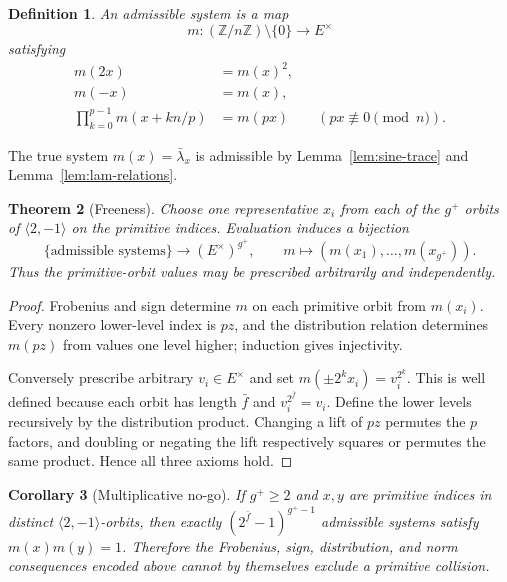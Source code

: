 \documentclass[a4paper]{article}
\newtheorem{theorem}{Theorem}[section]
\newtheorem{corollary}[theorem]{Corollary}
\newtheorem{definition}[theorem]{Definition}
\newcommand{\Z}{\mathbb{Z}}
\begin{document}
\begin{definition}\label{def:admissible-system}
	An \emph{admissible system} is a map
	\[
		m:(\Z/n\Z)\setminus\{0\}\longrightarrow E^\times
	\]
	satisfying
	\begin{align*}
		m(2x)&=m(x)^2,\\
		m(-x)&=m(x),\\
		\prod_{k=0}^{p-1}m(x+kn/p)&=m(px)
		\qquad(px\not\equiv0\pmod n).
	\end{align*}
\end{definition}

The true system $m(x)=\bar\lambda_x$ is admissible by
Lemma~\ref{lem:sine-trace} and Lemma~\ref{lem:lam-relations}.

\begin{theorem}[Freeness]\label{thm:admissible-freeness}
	Choose one representative $x_i$ from each of the $g^+$ orbits of
	$\langle2,-1\rangle$ on the primitive indices.  Evaluation induces a
	bijection
	\[
		\{\text{admissible systems}\}
		\longrightarrow(E^\times)^{g^+},
		\qquad
		m\longmapsto(m(x_1),\ldots,m(x_{g^+})).
	\]
	Thus the primitive-orbit values may be prescribed arbitrarily and
	independently.
\end{theorem}

\begin{proof}
	Frobenius and sign determine $m$ on each primitive orbit from
	$m(x_i)$.  Every nonzero lower-level index is $pz$, and the
	distribution relation determines $m(pz)$ from values one level higher;
	induction gives injectivity.

	Conversely prescribe arbitrary $v_i\in E^\times$ and set
	$m(\pm2^kx_i)=v_i^{2^k}$.  This is well defined because each orbit has
	length $\bar f$ and $v_i^{2^{\bar f}}=v_i$.  Define the lower levels
	recursively by the distribution product.  Changing a lift of $pz$
	permutes the $p$ factors, and doubling or negating the lift respectively
	squares or permutes the same product.  Hence all three axioms hold.
\end{proof}

\begin{corollary}[Multiplicative no-go]\label{cor:multiplicative-nogo}
	If $g^+\geq2$ and $x,y$ are primitive indices in distinct
	$\langle2,-1\rangle$-orbits, then exactly
	$(2^{\bar f}-1)^{g^+-1}$ admissible systems satisfy
	$m(x)m(y)=1$.  Therefore the Frobenius, sign, distribution, and norm
	consequences encoded above cannot by themselves exclude a primitive
	collision.
\end{corollary}
\end{document}
